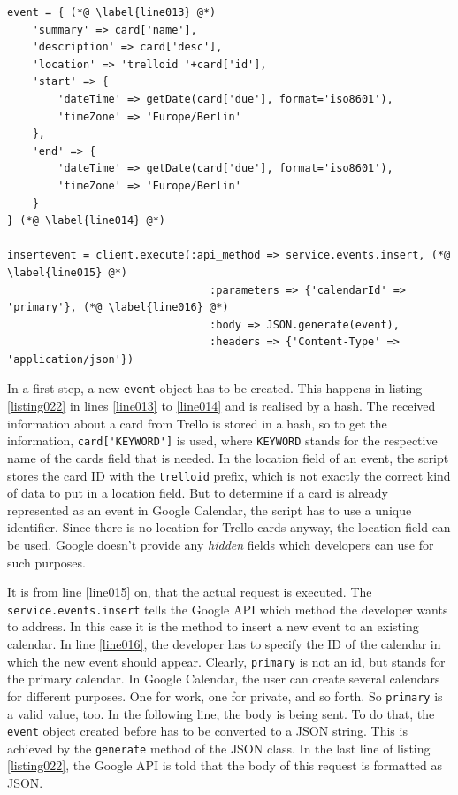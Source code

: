 \begin{lstlisting}[aboveskip=1\baselineskip, caption=Adding a new event to Google Calendar., label=listing022]
event = { (*@ \label{line013} @*)
	'summary' => card['name'],
	'description' => card['desc'],
	'location' => 'trelloid '+card['id'],
	'start' => {
		'dateTime' => getDate(card['due'], format='iso8601'),
		'timeZone' => 'Europe/Berlin'
	},
	'end' => {
		'dateTime' => getDate(card['due'], format='iso8601'),
		'timeZone' => 'Europe/Berlin'
	}
} (*@ \label{line014} @*)

insertevent = client.execute(:api_method => service.events.insert, (*@ \label{line015} @*)
								:parameters => {'calendarId' => 'primary'}, (*@ \label{line016} @*)
								:body => JSON.generate(event),
								:headers => {'Content-Type' => 'application/json'})
\end{lstlisting}

In a first step, a new \lstinline{event} object has to be created. This happens in listing \ref{listing022} in lines \ref{line013} to \ref{line014} and is realised by a hash. The received information about a card from Trello is stored in a hash, so to get the information, \lstinline{card['KEYWORD']} is used, where \lstinline{KEYWORD} stands for the respective name of the cards field that is needed. In the location field of an event, the script stores the card ID with the \texttt{trelloid} prefix, which is not exactly the correct kind of data to put in a location field. But to determine if a card is already represented as an event in Google Calendar, the script has to use a unique identifier. Since there is no location for Trello cards anyway, the location field can be used. Google doesn't provide any \emph{hidden} fields which developers can use for such purposes. 

It is from line \ref{line015} on, that the actual request is executed. The \lstinline{service.events.insert} tells the Google API which method the developer wants to address. \cite{google:calapi} In this case it is the method to insert a new event to an existing calendar. In line \ref{line016}, the developer has to specify the ID of the calendar in which the new event should appear. Clearly, \texttt{primary} is not an id, but stands for the primary calendar. In Google Calendar, the user can create several calendars for different purposes. One for work, one for private, and so forth. So \texttt{primary} is a valid value, too. In the following line, the body is being sent. To do that, the \lstinline{event} object created before has to be converted to a JSON string. This is achieved by the \lstinline{generate} method of the JSON class. \cite{json:docu} In the last line of listing \ref{listing022}, the Google API is told that the body of this request is formatted as JSON.


